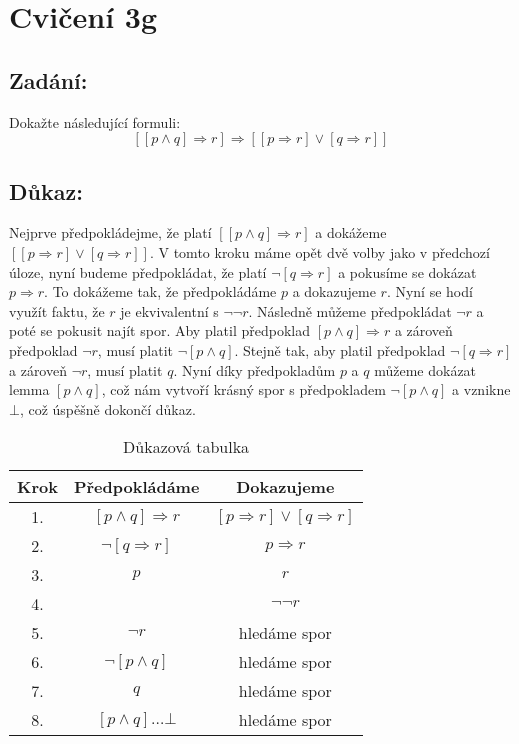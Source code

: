 \documentclass{article}
\begin{document}
\section{Cvičení 3g}

\subsection{Zadání:}

Dokažte následující formuli:
$$[[p \wedge q] \Rightarrow r] \Rightarrow [[p \Rightarrow r] \lor [q \Rightarrow r]]$$

\subsection{Důkaz:}

Nejprve předpokládejme, že platí $[[p \wedge q] \Rightarrow r]$ a dokážeme $[[p \Rightarrow r] \lor [q \Rightarrow r]]$. V tomto kroku máme opět dvě volby jako v předchozí úloze, nyní budeme předpokládat, že platí $\neg [q \Rightarrow r]$ a pokusíme se dokázat $p \Rightarrow r$. To dokážeme tak, že předpokládáme $p$ a dokazujeme $r$. Nyní se hodí využít faktu, že $r$ je ekvivalentní s $\neg \neg r$. Následně můžeme předpokládat $\neg r$ a poté se pokusit najít spor. Aby platil předpoklad $[p \wedge q] \Rightarrow r$ a zároveň předpoklad $\neg r$, musí platit $\neg [p \wedge q]$. Stejně tak, aby platil předpoklad $\neg [q \Rightarrow r]$ a zároveň $\neg r$, musí platit $q$. Nyní díky předpokladům $p$ a $q$ můžeme dokázat lemma $[p \wedge q]$, což nám vytvoří krásný spor s předpokladem $\neg [p \wedge q]$ a vznikne $\bot$, což úspěšně dokončí důkaz.

\begin{table}[H]\centering

    \caption{Důkazová tabulka}

\begin{tabular}{|c|c|c|}
    
    
        \hline \textbf{Krok} & \textbf{Předpokládáme} & \textbf{Dokazujeme} \\ \hline \hline
    	1. & $[p \wedge q] \Rightarrow r$ & $[p \Rightarrow r] \lor [q \Rightarrow r]$ \\ \hline
    	2. & $\neg [q \Rightarrow r]$ & $p \Rightarrow r$ \\ \hline
    	3. & $p$ & $r$ \\ \hline
    	4. &  & $\neg \neg r$ \\ \hline
    	5. & $\neg r$ & hledáme spor \\ \hline
    	6. & $\neg [p \wedge q]$ & hledáme spor \\ \hline
    	7. & $q$ & hledáme spor \\ \hline
    	8. & $[p \wedge q] \dots \bot$ & hledáme spor \\ \hline
            
    	\end{tabular}
\end{table}
\end{document}
